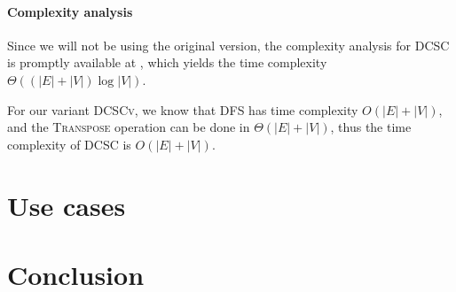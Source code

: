 \documentclass{report}[a4paper]
\theoremstyle{remark}
\begin{document}
\subsubsection{Complexity analysis}
Since we will not be using the original version, the complexity analysis for \textsc{DCSC} is promptly available at \cite{fleischer-dcsc}, which yields the time complexity $\Theta((|E|+|V|) \log |V|)$.\par
For our variant \textsc{DCSCv}, we know that \textsc{DFS} has time complexity $O(|E|+|V|)$, and the \textsc{Transpose} operation can be done in $\Theta(|E|+|V|)$, thus the time complexity of \textsc{DCSC} is $O(|E|+|V|)$.
\chapter{Use cases}
\chapter{Conclusion}


\end{document}
